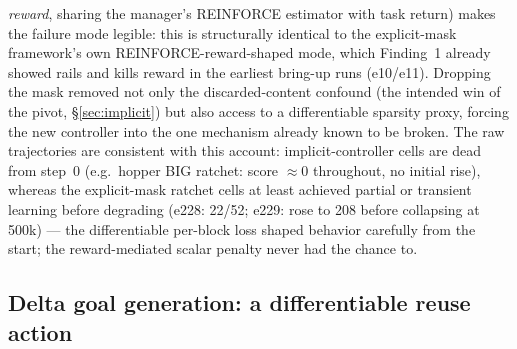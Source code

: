 \documentclass[10pt]{article}
\begin{document}
\emph{reward}, sharing the manager's REINFORCE estimator with task return)
makes the failure mode legible: this is structurally identical to the
explicit-mask framework's own REINFORCE-reward-shaped mode, which Finding~1
already showed rails and kills reward in the earliest bring-up runs
(e10/e11). Dropping the mask removed not only the discarded-content confound
(the intended win of the pivot, \S\ref{sec:implicit}) but also access to a
differentiable sparsity proxy, forcing the new controller into the one
mechanism already known to be broken. The raw trajectories are consistent
with this account: implicit-controller cells are dead from step~0 (e.g.\
hopper BIG ratchet: score $\approx 0$ throughout, no initial rise), whereas
the explicit-mask ratchet cells at least achieved partial or transient
learning before degrading (e228: 22/52; e229: rose to 208 before
collapsing at 500k) --- the differentiable per-block loss shaped behavior
carefully from the start; the reward-mediated scalar penalty never had the
chance to.

\subsection{Delta goal generation: a differentiable reuse action}
\label{sec:delta}
\end{document}
